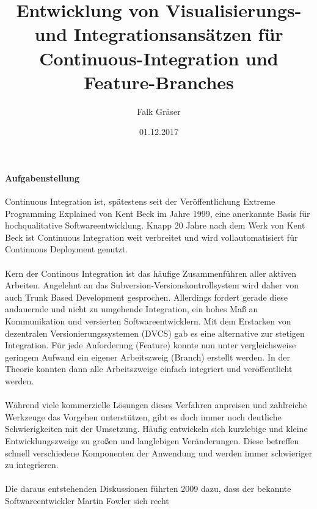 \documentclass[11pt,english,german]{article}
\begin{document}
\sffamily

\title{\vspace{-2.0cm}\textbf{Entwicklung von Visualisierungs- und Integrationsansätzen für Continuous-Integration und Feature-Branches}}
\author{Falk Gräser}
\date{01.12.2017}

\maketitle
{}

\paragraph{\textsf{Aufgabenstellung}}
Continuous Integration ist, spätestens seit der Veröffentlichung \glqq Extreme Programming Explained\grqq{}  von Kent Beck im Jahre 1999,
eine anerkannte Basis für hochqualitative Softwareentwicklung. Knapp 20 Jahre nach dem Werk von Kent Beck ist Continuous Integration weit
verbreitet und wird vollautomatisiert für Continuous Deployment genutzt.
\\
\\
Kern der Continous Integration ist das häufige Zusammenführen aller aktiven Arbeiten. Angelehnt an das \glqq Subversion\grqq{}-Versionskontrollsystem
wird daher von auch \glqq Trunk Based Development\grqq{} gesprochen.
Allerdings fordert gerade diese andauernde und nicht zu umgehende Integration, ein hohes Maß an Kommunikation und versierten Softwareentwicklern.
Mit dem Erstarken von dezentralen Versionierungssystemen (DVCS) gab es eine alternative zur stetigen Integration. Für jede Anforderung (Feature)
konnte nun unter vergleichsweise geringem Aufwand ein eigener Arbeitszweig (Branch) erstellt werden. In der Theorie konnten
dann alle Arbeitszweige \glqq einfach\grqq{} integriert und veröffentlicht werden.
\\
\\
Während viele kommerzielle Lösungen dieses Verfahren anpreisen und zahlreiche Werkzeuge das Vorgehen unterstützen, gibt
es doch immer noch deutliche Schwierigkeiten mit der Umsetzung. Häufig entwickeln sich \glqq kurzlebige und kleine\grqq{}
Entwicklungszweige zu \glqq großen und langlebigen\grqq{} Veränderungen. Diese betreffen schnell verschiedene Komponenten
der Anwendung und werden immer schwieriger zu integrieren.
\\
\\
Die daraus entstehenden Diskussionen führten 2009 dazu, dass der bekannte Softwareentwickler Martin Fowler sich recht
\end{document}
